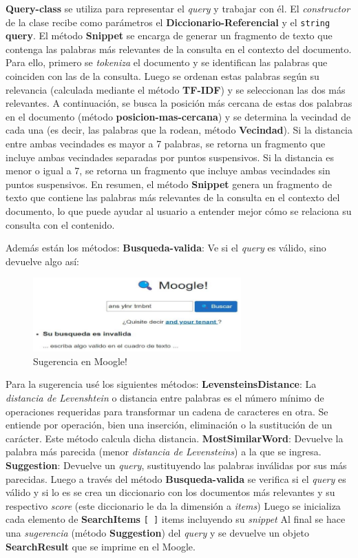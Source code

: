 \documentclass[a4paper,12pt]{article}
\begin{document}
\textbf{Query-class} se utiliza para representar el \textit{query} y trabajar con él. El \textit{constructor } de la clase recibe como parámetros el \textbf{Diccionario-Referencial} y el \texttt{string} \textbf{query}.
El método \textbf{Snippet} se encarga de generar un fragmento de texto que contenga las 
palabras más relevantes de la consulta en el contexto del documento. Para ello, primero se \textit{tokeniza} el documento y se identifican las palabras que coinciden con 
las de la consulta. Luego se ordenan estas palabras según su relevancia (calculada mediante el método \textbf{TF-IDF}) y se seleccionan las dos más relevantes. A continuación, se busca la posición más cercana de estas dos palabras en el documento (método \textbf{posicion-mas-cercana}) y se determina la vecindad de cada una (es decir, las palabras que la rodean, método \textbf{Vecindad}). Si la distancia entre ambas vecindades es mayor a 7 palabras, se retorna un fragmento que incluye ambas vecindades separadas por puntos suspensivos. Si la distancia es menor o igual a 7, se retorna un fragmento que incluye ambas vecindades sin puntos suspensivos. En resumen, el método \textbf{Snippet} genera un fragmento de texto que contiene las palabras más relevantes de la consulta en el contexto del documento, lo que puede ayudar al usuario a entender mejor cómo se relaciona su consulta con el contenido.

Además están los métodos:
\textbf{Busqueda-valida}: Ve si el \textit{query} es válido, sino devuelve algo así:

\begin{figure}[h]
    \center
    \includegraphics[width=8cm]{suggestion.png}
    \caption{Sugerencia en Moogle!}
    \label{fig:suggestion}
\end{figure}

Para la sugerencia usé los siguientes métodos: 
\textbf{LevensteinsDistance}: La \textit{distancia de Levenshtein} o distancia entre palabras es el número mínimo de operaciones requeridas para transformar un cadena de caracteres en otra. Se entiende por operación, bien una inserción, eliminación o la sustitución de un carácter. Este método calcula dicha distancia.
\textbf{MostSimilarWord}: Devuelve la palabra más parecida (menor \textit{distancia de Levensteins}) a la que se ingresa.
\textbf{Suggestion}: Devuelve un \textit{query}, sustituyendo las palabras inválidas por sus más parecidas. 
Luego a través del método \textbf{Busqueda-valida} se verifica si el \textit{query} es válido y si lo es se crea un diccionario con los documentos más relevantes y su respectivo \textit{score} (este diccionario le da la dimensión a \textit{items}) Luego se inicializa cada elemento de 
\textbf{SearchItems} \texttt{[ ]} items incluyendo su \textit{snippet}
Al final se hace una \textit{sugerencia} (método \textbf{Suggestion}) del \textit{query} y se devuelve un 
objeto \textbf{SearchResult} que se imprime en el \large{Moogle}.
\end{document}
